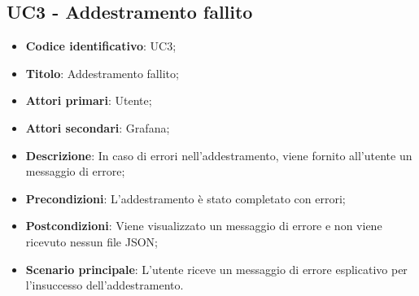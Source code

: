 	\subsection{UC3 - Addestramento fallito}
	\begin{itemize}
		\item \textbf{Codice identificativo}: UC3;
		\item \textbf{Titolo}: Addestramento fallito;
		\item \textbf{Attori primari}: Utente;
		\item \textbf{Attori secondari}: Grafana\glo;
		\item \textbf{Descrizione}: In caso di errori nell'addestramento, viene fornito all'utente un messaggio di errore;
		\item \textbf{Precondizioni}: L'addestramento è stato completato con errori;
		\item \textbf{Postcondizioni}: Viene visualizzato un messaggio di errore e non viene ricevuto nessun file JSON;
		\item \textbf{Scenario principale}: L'utente riceve un messaggio di errore esplicativo per l'insuccesso dell'addestramento.
	\end{itemize}
